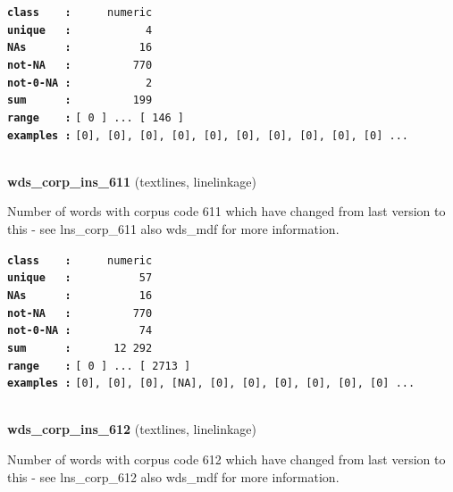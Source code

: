 \documentclass[]{article}
\begin{document}
\textbf{\texttt{class\ \ \ \ :}} \texttt{~~~~~numeric}\\
\textbf{\texttt{unique\ \ \ :}} \texttt{~~~~~~~~~~~4}\\
\textbf{\texttt{NAs\ \ \ \ \ \ :}} \texttt{~~~~~~~~~~16}\\
\textbf{\texttt{not-NA\ \ \ :}} \texttt{~~~~~~~~~770}\\
\textbf{\texttt{not-0-NA\ :}} \texttt{~~~~~~~~~~~2}\\
\textbf{\texttt{sum\ \ \ \ \ \ :}} \texttt{~~~~~~~~~199}\\
\textbf{\texttt{range\ \ \ \ :}}
\texttt{{[}\ 0\ {]}\ ...\ {[}\ 146\ {]}}\\
\textbf{\texttt{examples\ :}}
\texttt{{[}0{]},\ {[}0{]},\ {[}0{]},\ {[}0{]},\ {[}0{]},\ {[}0{]},\ {[}0{]},\ {[}0{]},\ {[}0{]},\ {[}0{]}\ ...}\\

~

\textbf{wds\_corp\_ins\_611} (textlines, linelinkage)

Number of words with corpus code 611 which have changed from last
version to this - see lns\_corp\_611 also wds\_mdf for more information.

\textbf{\texttt{class\ \ \ \ :}} \texttt{~~~~~numeric}\\
\textbf{\texttt{unique\ \ \ :}} \texttt{~~~~~~~~~~57}\\
\textbf{\texttt{NAs\ \ \ \ \ \ :}} \texttt{~~~~~~~~~~16}\\
\textbf{\texttt{not-NA\ \ \ :}} \texttt{~~~~~~~~~770}\\
\textbf{\texttt{not-0-NA\ :}} \texttt{~~~~~~~~~~74}\\
\textbf{\texttt{sum\ \ \ \ \ \ :}} \texttt{~~~~~~12~292}\\
\textbf{\texttt{range\ \ \ \ :}}
\texttt{{[}\ 0\ {]}\ ...\ {[}\ 2713\ {]}}\\
\textbf{\texttt{examples\ :}}
\texttt{{[}0{]},\ {[}0{]},\ {[}0{]},\ {[}NA{]},\ {[}0{]},\ {[}0{]},\ {[}0{]},\ {[}0{]},\ {[}0{]},\ {[}0{]}\ ...}\\

~

\textbf{wds\_corp\_ins\_612} (textlines, linelinkage)

Number of words with corpus code 612 which have changed from last
version to this - see lns\_corp\_612 also wds\_mdf for more information.
\end{document}
